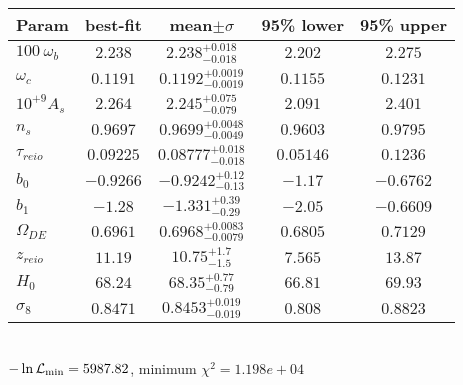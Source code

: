 \begin{tabular}{|l|c|c|c|c|} 
 \hline 
Param & best-fit & mean$\pm\sigma$ & 95\% lower & 95\% upper \\ \hline 
$100~\omega_{b }$ &$2.238$ & $2.238_{-0.018}^{+0.018}$ & $2.202$ & $2.275$ \\ 
$\omega_c$ &$0.1191$ & $0.1192_{-0.0019}^{+0.0019}$ & $0.1155$ & $0.1231$ \\ 
$10^{+9}A_{s }$ &$2.264$ & $2.245_{-0.079}^{+0.075}$ & $2.091$ & $2.401$ \\ 
$n_{s }$ &$0.9697$ & $0.9699_{-0.0049}^{+0.0048}$ & $0.9603$ & $0.9795$ \\ 
$\tau_{reio }$ &$0.09225$ & $0.08777_{-0.018}^{+0.018}$ & $0.05146$ & $0.1236$ \\ 
$b_{0 }$ &$-0.9266$ & $-0.9242_{-0.13}^{+0.12}$ & $-1.17$ & $-0.6762$ \\ 
$b_{1 }$ &$-1.28$ & $-1.331_{-0.29}^{+0.39}$ & $-2.05$ & $-0.6609$ \\ 
$\Omega_{DE}$ &$0.6961$ & $0.6968_{-0.0079}^{+0.0083}$ & $0.6805$ & $0.7129$ \\ 
$z_{reio }$ &$11.19$ & $10.75_{-1.5}^{+1.7}$ & $7.565$ & $13.87$ \\ 
$H_{0 }$ &$68.24$ & $68.35_{-0.79}^{+0.77}$ & $66.81$ & $69.93$ \\ 
$\sigma_8$ &$0.8471$ & $0.8453_{-0.019}^{+0.019}$ & $0.808$ & $0.8823$ \\ 
\hline 
 \end{tabular} \\ 
$-\ln{\cal L}_\mathrm{min} =5987.82$, minimum $\chi^2=1.198e+04$ \\ 
